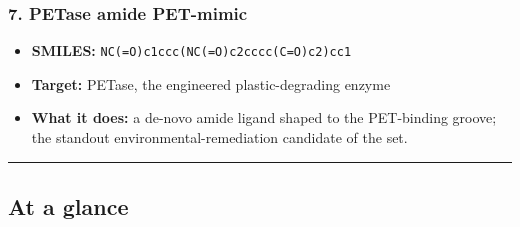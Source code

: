 \hypertarget{petase-amide-pet-mimic}{%
\subsubsection{7. PETase amide PET-mimic}\label{petase-amide-pet-mimic}}

\begin{itemize}
\tightlist
\item
  \textbf{SMILES:} \texttt{NC(=O)c1ccc(NC(=O)c2cccc(C=O)c2)cc1}
\item
  \textbf{Target:} PETase, the engineered plastic-degrading enzyme
\item
  \textbf{What it does:} a de-novo amide ligand shaped to the
  PET-binding groove; the standout environmental-remediation candidate
  of the set.
\end{itemize}

\begin{center}\rule{0.5\linewidth}{0.5pt}\end{center}

\hypertarget{at-a-glance}{%
\subsection{At a glance}\label{at-a-glance}}

